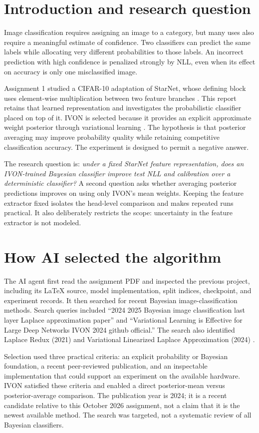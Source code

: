 \documentclass[11pt,a4paper]{article}
\begin{document}
\section{Introduction and research question}
Image classification requires assigning an image to a category, but many uses
also require a meaningful estimate of confidence. Two classifiers can predict
the same labels while allocating very different probabilities to those labels.
An incorrect prediction with high confidence is penalized strongly by NLL,
even when its effect on accuracy is only one misclassified image.

Assignment 1 studied a CIFAR-10 adaptation of StarNet, whose defining block uses
element-wise multiplication between two feature branches \cite{ma}. This report
retains that learned representation and investigates the probabilistic classifier
placed on top of it. IVON is selected because it provides an explicit approximate
weight posterior through variational learning \cite{shen}. The hypothesis is that
posterior averaging may improve probability quality while retaining competitive
classification accuracy. The experiment is designed to permit a negative answer.

The research question is: \emph{under a fixed StarNet feature representation,
does an IVON-trained Bayesian classifier improve test NLL and calibration over
a deterministic classifier?} A second question asks whether averaging posterior
predictions improves on using only IVON's mean weights. Keeping the feature
extractor fixed isolates the head-level comparison and makes repeated runs
practical. It also deliberately restricts the scope: uncertainty in the feature
extractor is not modeled.

\section{How AI selected the algorithm}
The AI agent first read the assignment PDF and inspected the previous project,
including its LaTeX source, model implementation, split indices, checkpoint, and
experiment records. It then searched for recent Bayesian image-classification
methods. Search queries included ``2024 2025 Bayesian image classification last
layer Laplace approximation paper'' and ``Variational Learning is Effective for
Large Deep Networks IVON 2024 github official.'' The search also identified
Laplace Redux (2021) and Variational Linearized Laplace Approximation (2024)
\cite{daxberger,ortega}.

Selection used three practical criteria: an explicit probability or Bayesian
foundation, a recent peer-reviewed publication, and an inspectable implementation
that could support an experiment on the available hardware. IVON satisfied these
criteria and enabled a direct posterior-mean versus posterior-average comparison.
The publication year is 2024; it is a recent candidate relative to this October
2026 assignment, not a claim that it is the newest available method. The search
was targeted, not a systematic review of all Bayesian classifiers.
\end{document}
